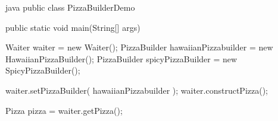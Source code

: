\begin{codeboxNl}[Customer]{java}
public class PizzaBuilderDemo {
    public static void main(String[] args) {
        Waiter waiter = new Waiter();
        PizzaBuilder hawaiianPizzabuilder = new HawaiianPizzaBuilder();
        PizzaBuilder spicyPizzaBuilder = new SpicyPizzaBuilder();

        waiter.setPizzaBuilder( hawaiianPizzabuilder );
        waiter.constructPizza();

        Pizza pizza = waiter.getPizza();
    }
}
\end{codeboxNl}
